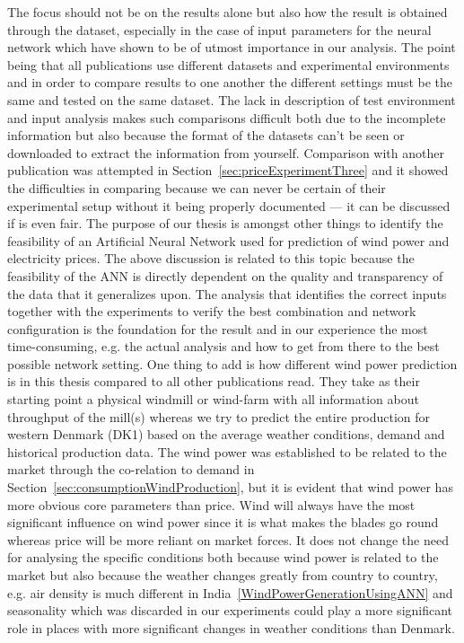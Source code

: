 The focus should not be on the results alone but also how the result is obtained through the dataset, especially in the case of input parameters for the neural network which have shown to be of utmost importance in our analysis. The point being that all publications use different datasets and experimental environments and in order to compare results to one another the different settings must be the same and tested on the same dataset. The lack in description of test environment and input analysis makes such comparisons difficult both due to the incomplete information but also because the format of the datasets can't be seen or downloaded to extract the information from yourself. Comparison with another publication was attempted in Section~\ref{sec:priceExperimentThree} and it showed the difficulties in comparing because we can never be certain of their experimental setup without it being properly documented --- it can be discussed if is even fair. The purpose of our thesis is amongst other things to identify the feasibility of an Artificial Neural Network used for prediction of wind power and electricity prices. The above discussion is related to this topic because the feasibility of the ANN is directly dependent on the quality and transparency of the data that it generalizes upon. The analysis that identifies the correct inputs together with the experiments to verify the best combination and network configuration is the foundation for the result and in our experience the most time-consuming, e.g. the actual analysis and how to get from there to the best possible network setting. One thing to add is how different wind power prediction is in this thesis compared to all other publications read. They take as their starting point a physical windmill or wind-farm with all information about throughput of the mill(s) whereas we try to predict the entire production for western Denmark (DK1) based on the average weather conditions, demand and historical production data. The wind power was established to be related to the market through the co-relation to demand in Section~\ref{sec:consumptionWindProduction}, but it is evident that wind power has more obvious core parameters than price. Wind will always have the most significant influence on wind power since it is what makes the blades go round whereas price will be more reliant on market forces. It does not change the need for analysing the specific conditions both because wind power is related to the market but also because the weather changes greatly from country to country, e.g. air density is much different in India~\ref{WindPowerGenerationUsingANN} and seasonality which was discarded in our experiments could play a more significant role in places with more significant changes in weather conditions than Denmark.

